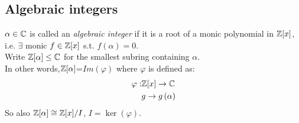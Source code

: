 \documentclass[a4paper]{article}
\begin{document}
\subsection{Algebraic integers}
\begin{defi}
$\alpha\in\mathbb{C}$ is called an \emph{algebraic integer} if it is a root of a monic polynomial in $\mathbb{Z}[x]$, i.e. $\exists$ monic $f\in\mathbb{Z}[x]$ s.t. $f\left(\alpha\right)=0$.\\
Write $\mathbb{Z}[\alpha]\leq \mathbb{C}$ for the smallest subring containing $\alpha$.\\
In other words,$\mathbb{Z}[\alpha]$=$Im\left(\varphi\right)$ where $\varphi$ is defined as:
\begin{equation*}
\begin{aligned}
\varphi: &\mathbb{Z}[x] \to \mathbb{C}\\
&g\to g\left(\alpha\right)
\end{aligned}
\end{equation*}
So also $\mathbb{Z}[\alpha] \cong \mathbb{Z}[x]/I$, $I=\ker\left(\varphi\right)$.
\end{defi}
\end{document}
